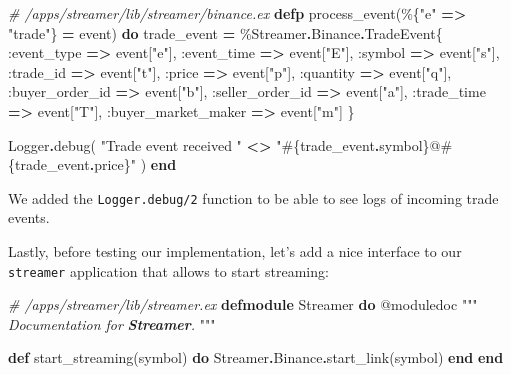 \documentclass[
]{book}
\newenvironment{Shaded}{\begin{snugshade}}{\end{snugshade}}
\newcommand{\CommentTok}[1]{\textcolor[rgb]{0.56,0.35,0.01}{\textit{#1}}}
\newcommand{\ConstantTok}[1]{\textcolor[rgb]{0.00,0.00,0.00}{#1}}
\newcommand{\InformationTok}[1]{\textcolor[rgb]{0.56,0.35,0.01}{\textbf{\textit{#1}}}}
\newcommand{\KeywordTok}[1]{\textcolor[rgb]{0.13,0.29,0.53}{\textbf{#1}}}
\newcommand{\NormalTok}[1]{#1}
\newcommand{\OperatorTok}[1]{\textcolor[rgb]{0.81,0.36,0.00}{\textbf{#1}}}
\newcommand{\OtherTok}[1]{\textcolor[rgb]{0.56,0.35,0.01}{#1}}
\newcommand{\StringTok}[1]{\textcolor[rgb]{0.31,0.60,0.02}{#1}}
\newcommand{\VariableTok}[1]{\textcolor[rgb]{0.00,0.00,0.00}{#1}}
\begin{document}
\begin{Shaded}
\begin{Highlighting}[]
  \CommentTok{\# /apps/streamer/lib/streamer/binance.ex}
  \KeywordTok{defp}\NormalTok{ process\_event(\%\{}\StringTok{"e"} \OperatorTok{=\textgreater{}} \StringTok{"trade"}\NormalTok{\} }\OperatorTok{=}\NormalTok{ event) }\KeywordTok{do}
\NormalTok{    trade\_event }\OperatorTok{=}\NormalTok{ \%}\ConstantTok{Streamer}\OperatorTok{.}\ConstantTok{Binance}\OperatorTok{.}\ConstantTok{TradeEvent}\NormalTok{\{}
      \VariableTok{:event\_type} \OperatorTok{=\textgreater{}}\NormalTok{ event[}\StringTok{"e"}\NormalTok{],}
      \VariableTok{:event\_time} \OperatorTok{=\textgreater{}}\NormalTok{ event[}\StringTok{"E"}\NormalTok{],}
      \VariableTok{:symbol} \OperatorTok{=\textgreater{}}\NormalTok{ event[}\StringTok{"s"}\NormalTok{],}
      \VariableTok{:trade\_id} \OperatorTok{=\textgreater{}}\NormalTok{ event[}\StringTok{"t"}\NormalTok{],}
      \VariableTok{:price} \OperatorTok{=\textgreater{}}\NormalTok{ event[}\StringTok{"p"}\NormalTok{],}
      \VariableTok{:quantity} \OperatorTok{=\textgreater{}}\NormalTok{ event[}\StringTok{"q"}\NormalTok{],}
      \VariableTok{:buyer\_order\_id} \OperatorTok{=\textgreater{}}\NormalTok{ event[}\StringTok{"b"}\NormalTok{],}
      \VariableTok{:seller\_order\_id} \OperatorTok{=\textgreater{}}\NormalTok{ event[}\StringTok{"a"}\NormalTok{],}
      \VariableTok{:trade\_time} \OperatorTok{=\textgreater{}}\NormalTok{ event[}\StringTok{"T"}\NormalTok{],}
      \VariableTok{:buyer\_market\_maker} \OperatorTok{=\textgreater{}}\NormalTok{ event[}\StringTok{"m"}\NormalTok{]}
\NormalTok{    \}}

    \ConstantTok{Logger}\OperatorTok{.}\NormalTok{debug(}
      \StringTok{"Trade event received "} \OperatorTok{\textless{}\textgreater{}}
        \StringTok{"}\OtherTok{\#\{}\NormalTok{trade\_event}\OperatorTok{.}\NormalTok{symbol}\OtherTok{\}}\StringTok{@}\OtherTok{\#\{}\NormalTok{trade\_event}\OperatorTok{.}\NormalTok{price}\OtherTok{\}}\StringTok{"}
\NormalTok{    )}
  \KeywordTok{end}
\end{Highlighting}
\end{Shaded}

We added the \texttt{Logger.debug/2} function to be able to see logs of incoming trade events.

Lastly, before testing our implementation, let's add a nice interface to our \texttt{streamer} application that allows to start streaming:

\begin{Shaded}
\begin{Highlighting}[]
\CommentTok{\# /apps/streamer/lib/streamer.ex}
\KeywordTok{defmodule} \ConstantTok{Streamer} \KeywordTok{do}
  \OtherTok{@moduledoc """}
\CommentTok{  Documentation for }\InformationTok{\textasciigrave{}Streamer\textasciigrave{}}\CommentTok{.}
\CommentTok{  }\OtherTok{"""}

  \KeywordTok{def}\NormalTok{ start\_streaming(symbol) }\KeywordTok{do}
    \ConstantTok{Streamer}\OperatorTok{.}\ConstantTok{Binance}\OperatorTok{.}\NormalTok{start\_link(symbol)}
  \KeywordTok{end}
\KeywordTok{end}
\end{Highlighting}
\end{Shaded}
\end{document}
